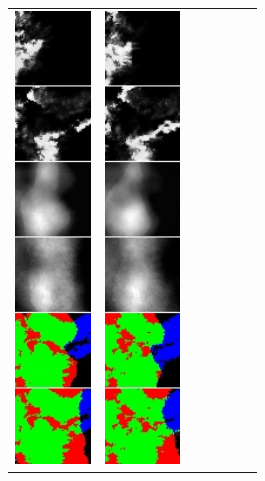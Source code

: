 \begin{figure}[h]
\begin{tabular}{lllllll}
\includegraphics[width=20mm]{abb/prediction/102_maxCont}&
\includegraphics[width=20mm]{abb/prediction/103_maxCont}&

\end{tabular}
\end{figure}
